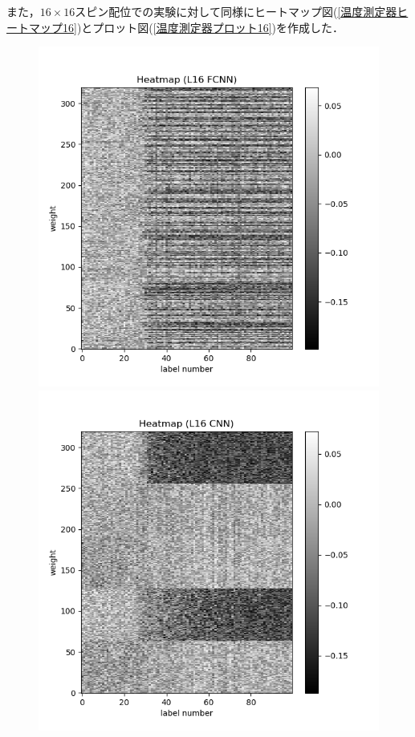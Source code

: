\documentclass[a4paper,11pt]{jsreport}
\begin{document}
また，$16 \times 16$スピン配位での実験に対して同様にヒートマップ図(\ref{温度測定器ヒートマップ16})とプロット図(\ref{温度測定器プロット16})を作成した．

\begin{figure}[H]
  \begin{minipage}[b]{0.45\linewidth}
    \begin{center}
      \includegraphics[keepaspectratio, scale=0.5]{image/L16_FCNN_weight.png}
    \end{center}
  \end{minipage}
  \begin{minipage}[b]{0.45\linewidth}
    \begin{center}
      \includegraphics[keepaspectratio, scale=0.5]{image/L16_CNN_weight.png}

\end{center}
\end{minipage}
\end{figure}
\end{document}
